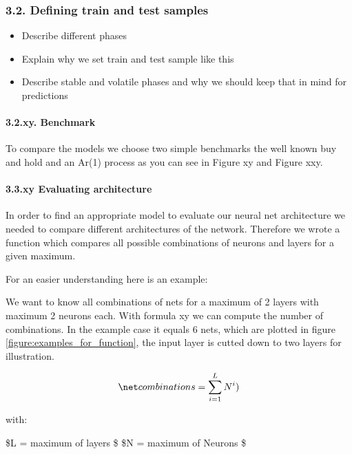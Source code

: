 \documentclass[
]{article}
\begin{document}
\hypertarget{defining-train-and-test-samples}{%
\subsubsection{3.2. Defining train and test
samples}\label{defining-train-and-test-samples}}

\begin{itemize}
\item
  Describe different phases
\item
  Explain why we set train and test sample like this
\item
  Describe stable and volatile phases and why we should keep that in
  mind for predictions
\end{itemize}

\hypertarget{xy.-benchmark}{%
\paragraph{3.2.xy. Benchmark}\label{xy.-benchmark}}

To compare the models we choose two simple benchmarks the well known buy
and hold and an Ar(1) process as you can see in Figure xy and Figure
xxy.

\hypertarget{xy-evaluating-architecture}{%
\paragraph{3.3.xy Evaluating
architecture}\label{xy-evaluating-architecture}}

In order to find an appropriate model to evaluate our neural net
architecture we needed to compare different architectures of the
network. Therefore we wrote a function which compares all possible
combinations of neurons and layers for a given maximum.

For an easier understanding here is an example:

We want to know all combinations of nets for a maximum of 2 layers with
maximum 2 neurons each. With formula xy we can compute the number of
combinations. In the example case it equals 6 nets, which are plotted in
figure \ref{figure:examples_for_function}, the input layer is cutted
down to two layers for illustration.

\begin{align} \label{eq:complexity}
\net combinations=\sum_{i=1}^{L}N^{i})
\end{align}

with:

\$L = maximum of layers \in \N \$ \$N = maximum of Neurons \in \N \$
\end{document}

